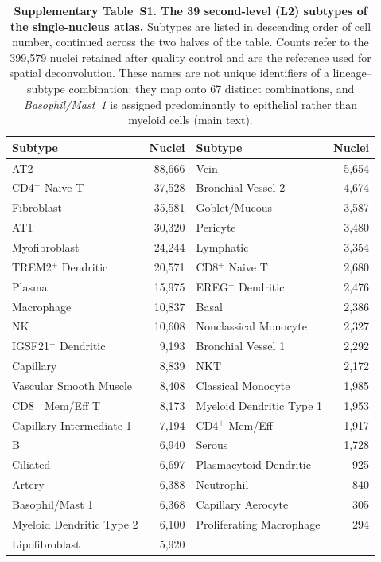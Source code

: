 \begin{table}[!ht]
\centering
\caption*{\textbf{Supplementary Table~S1. The 39 second-level (L2) subtypes of the
single-nucleus atlas.} Subtypes are listed in descending order of cell number, continued
across the two halves of the table. Counts refer to the 399{,}579 nuclei retained after
quality control and are the reference used for spatial deconvolution. These names are not
unique identifiers of a lineage--subtype combination: they map onto 67 distinct
combinations, and \emph{Basophil/Mast~1} is assigned predominantly to epithelial rather
than myeloid cells (main text).}
\label{tab:s1}
\small
\begin{tabular}{@{}lr@{\hspace{3.2em}}lr@{}}
\toprule
\tabheadfont Subtype & \tabheadfont Nuclei & \tabheadfont Subtype & \tabheadfont Nuclei \\
\midrule
AT2 & 88,666 & Vein & 5,654 \\
CD4$^{+}$ Naive T & 37,528 & Bronchial Vessel 2 & 4,674 \\
Fibroblast & 35,581 & Goblet/Mucous & 3,587 \\
AT1 & 30,320 & Pericyte & 3,480 \\
Myofibroblast & 24,244 & Lymphatic & 3,354 \\
TREM2$^{+}$ Dendritic & 20,571 & CD8$^{+}$ Naive T & 2,680 \\
Plasma & 15,975 & EREG$^{+}$ Dendritic & 2,476 \\
Macrophage & 10,837 & Basal & 2,386 \\
NK & 10,608 & Nonclassical Monocyte & 2,327 \\
IGSF21$^{+}$ Dendritic & 9,193 & Bronchial Vessel 1 & 2,292 \\
Capillary & 8,839 & NKT & 2,172 \\
Vascular Smooth Muscle & 8,408 & Classical Monocyte & 1,985 \\
CD8$^{+}$ Mem/Eff T & 8,173 & Myeloid Dendritic Type 1 & 1,953 \\
Capillary Intermediate 1 & 7,194 & CD4$^{+}$ Mem/Eff & 1,917 \\
B & 6,940 & Serous & 1,728 \\
Ciliated & 6,697 & Plasmacytoid Dendritic & 925 \\
Artery & 6,388 & Neutrophil & 840 \\
Basophil/Mast 1 & 6,368 & Capillary Aerocyte & 305 \\
Myeloid Dendritic Type 2 & 6,100 & Proliferating Macrophage & 294 \\
Lipofibroblast & 5,920 &  &  \\
\bottomrule
\end{tabular}
\end{table}
